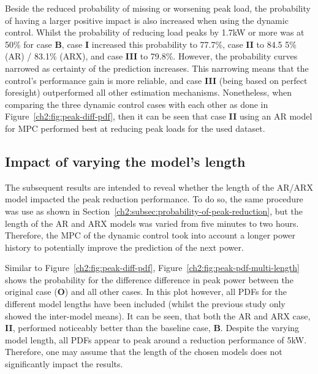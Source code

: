 Beside the reduced probability of missing or worsening peak load, the probability of having a larger positive impact is also increased when using the dynamic control.
Whilst the probability of reducing load peaks by 1.7kW or more was at 50\% for case \textbf{B}, case \textbf{I} increased this probability to 77.7\%, case \textbf{II} to 84.5 5\% (AR) / 83.1\% (ARX), and case \textbf{III} to 79.8\%.
However, the probability curves narrowed as certainty of the prediction increases.
This narrowing means that the control's performance gain is more reliable, and case \textbf{III} (being based on perfect foresight) outperformed all other estimation mechanisms.
Nonetheless, when comparing the three dynamic control cases with each other as done in Figure~\ref{ch2:fig:peak-diff-pdf}, then it can be seen that case \textbf{II} using an AR model for MPC performed best at reducing peak loads for the used dataset.

\subsection{Impact of varying the model's length}

The subsequent results are intended to reveal whether the length of the AR/ARX model impacted the peak reduction performance.
To do so, the same procedure was use as shown in Section~\ref{ch2:subsec:probability-of-peak-reduction}, but the length of the AR and ARX models was varied from five minutes to two hours.
Therefore, the MPC of the dynamic control took into account a longer power history to potentially improve the prediction of the next power.



Similar to Figure~\ref{ch2:fig:peak-diff-pdf}, Figure~\ref{ch2:fig:peak-pdf-multi-length} shows the probability for the difference difference in peak power between the original case (\textbf{O}) and all other cases.
In this plot however, all PDFs for the different model lengths have been included (whilst the previous study only showed the inter-model means).
It can be seen, that both the AR and ARX case, \textbf{II}, performed noticeably better than the baseline case, \textbf{B}.
Despite the varying model length, all PDFs appear to peak around a reduction performance of 5kW.
Therefore, one may assume that the length of the chosen models does not significantly impact the results.



